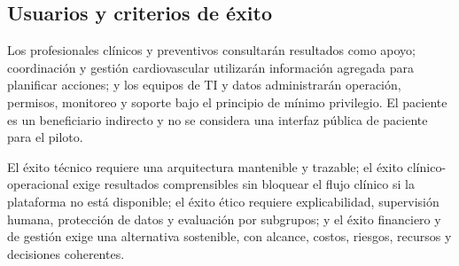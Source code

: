 \subsection{Usuarios y criterios de éxito}

Los profesionales clínicos y preventivos consultarán resultados como apoyo; coordinación y gestión cardiovascular utilizarán información agregada para planificar acciones; y los equipos de TI y datos administrarán operación, permisos, monitoreo y soporte bajo el principio de mínimo privilegio. El paciente es un beneficiario indirecto y no se considera una interfaz pública de paciente para el piloto.

El éxito técnico requiere una arquitectura mantenible y trazable; el éxito clínico-operacional exige resultados comprensibles sin bloquear el flujo clínico si la plataforma no está disponible; el éxito ético requiere explicabilidad, supervisión humana, protección de datos y evaluación por subgrupos; y el éxito financiero y de gestión exige una alternativa sostenible, con alcance, costos, riesgos, recursos y decisiones coherentes.
